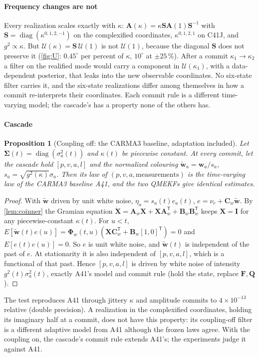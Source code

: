 \documentclass[conference]{IEEEtran}
\DeclareRobustCommand{\vct}[1]{\bm{#1}}
\DeclareRobustCommand{\mat}[1]{\bm{#1}}
\newcommand{\T}{^{\mathsf T}}
\theoremstyle{bodysmall}
\newtheorem{proposition}{Proposition}
\begin{document}
\paragraph{Frequency changes are not}
Every realization scales exactly with $\kappa$:
$\mat A(\kappa)=\kappa\mat S\mat A(1)\mat S^{-1}$ with
$\mat S=\operatorname{diag}(\kappa^{0,1,2,-1})$ on the complexified
coordinates, $\kappa^{0,1,2,1}$ on C41J, and $g^2\propto\kappa$. But
$\mathcal U(\kappa)=\mat S\,\mathcal U(1)$ is not $\mathcal U(1)$, because the
diagonal $\mat S$ does not preserve it (\cref{fig:U}: $0.45^\circ$ per percent
of $\kappa$, $10^\circ$ at $\pm25\,\%$). After a commit $\kappa_1\to\kappa_2$ a
filter on the realified mode would carry a component in $\mathcal U(\kappa_1)$,
with a data-dependent posterior, that leaks into the new observable
coordinates. No six-state filter carries it, and the six-state realizations
differ among themselves in how a commit re-interprets their coordinates.
Each commit rule is a different time-varying model; the cascade's has a
property none of the others has.

\paragraph{Cascade}
\begin{proposition}[Coupling off: the CARMA3 baseline, adaptation included]
\label{prop:a41}
Let $\mat\Sigma(t)=\operatorname{diag}(\sigma_a^2(t))$ and $\kappa(t)$ be
piecewise constant. At every commit, let the cascade hold $[p,v,a,l]$ and the
normalized colouring $\tilde{\vct w}_a=\vct w_a/s_a$, $s_a=\sqrt{g^2(\kappa)}\sigma_a$.
Then its law of $(p,v,a,\text{measurements})$ is the time-varying law of the
CARMA3 baseline A41, and the two QMEKFs give identical estimates.
\end{proposition}
\begin{proof}
With $\tilde{\vct w}$ driven by unit white noise, $\eta_a=s_a(t)e_a(t)$,
$e=\nu_r+\mat C_w\tilde{\vct w}$. By \cref{lem:coinner} the Gramian
equation $\dot{\mat X}=\mat A_w\mat X+\mat X\mat A_w\T+\mat B_w\mat B_w\T$
keeps $\mat X=\mat I$ for any piecewise-constant $\kappa(t)$. For $u<t$,
$E[\tilde{\vct w}(t)e(u)]=\mat\Phi_w(t,u)(\mat X\mat C_w\T+\mat B_w[1,0]\T)=0$
and $E[e(t)e(u)]=0$. So $e$ is unit white noise, and $\tilde{\vct w}(t)$ is
independent of the past of $e$. At stationarity it is also independent of
$[p,v,a,l]$, which is a functional of that past. Hence $[p,v,a,l]$ is driven
by white noise of intensity $g^2(t)\sigma_a^2(t)$, exactly A41's model and
commit rule (hold the state, replace $\mat F,\mat Q$).
\end{proof}
The test reproduces A41 through jittery $\kappa$ and amplitude commits to
$4\times10^{-13}$ relative (double precision). A realization in the
complexified coordinates, holding its imaginary half at a commit, does not
have this property: its coupling-off filter is a different adaptive model
from A41 although the frozen laws agree. With the coupling on, the cascade's
commit rule extends A41's; the experiments judge it against A41.
\end{document}
